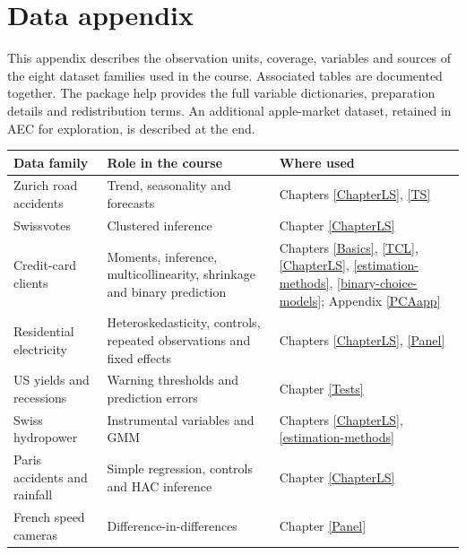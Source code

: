 \documentclass[
  11pt,
]{book}
\theoremstyle{definition}
\theoremstyle{definition}
\theoremstyle{definition}
\theoremstyle{definition}
\theoremstyle{remark}
\begin{document}
\chapter{Data appendix}\label{data-appendix}

This appendix describes the observation units, coverage, variables and sources of the eight dataset families used in the course. Associated tables are documented together. The package help provides the full variable dictionaries, preparation details and redistribution terms. An additional apple-market dataset, retained in AEC for exploration, is described at the end.

\begin{longtable}[]{@{}
  >{\raggedright\arraybackslash}p{}
  >{\raggedright\arraybackslash}p{}
  >{\raggedright\arraybackslash}p{}@{}}
\toprule\noalign{}
\begin{minipage}[b]{\linewidth}\raggedright
Data family
\end{minipage} & \begin{minipage}[b]{\linewidth}\raggedright
Role in the course
\end{minipage} & \begin{minipage}[b]{\linewidth}\raggedright
Where used
\end{minipage} \\
\midrule\noalign{}
\endhead
\bottomrule\noalign{}
\endlastfoot
Zurich road accidents & Trend, seasonality and forecasts & Chapters \ref{ChapterLS}, \ref{TS} \\
Swissvotes & Clustered inference & Chapter \ref{ChapterLS} \\
Credit-card clients & Moments, inference, multicollinearity, shrinkage and binary prediction & Chapters \ref{Basics}, \ref{TCL}, \ref{ChapterLS}, \ref{estimation-methods}, \ref{binary-choice-models}; Appendix \ref{PCAapp} \\
Residential electricity & Heteroskedasticity, controls, repeated observations and fixed effects & Chapters \ref{ChapterLS}, \ref{Panel} \\
US yields and recessions & Warning thresholds and prediction errors & Chapter \ref{Tests} \\
Swiss hydropower & Instrumental variables and GMM & Chapters \ref{ChapterLS}, \ref{estimation-methods} \\
Paris accidents and rainfall & Simple regression, controls and HAC inference & Chapter \ref{ChapterLS} \\
French speed cameras & Difference-in-differences & Chapter \ref{Panel} \\
\end{longtable}
\end{document}

